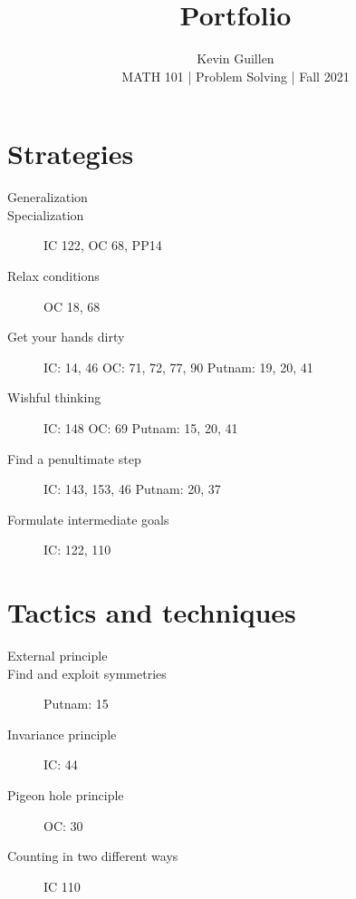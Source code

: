 \documentclass[11pt]{article}
\begin{document}
 
\title{Portfolio}
\author{Kevin Guillen\\[0.5em]
MATH 101 | Problem Solving | Fall 2021}
\date{} 
\maketitle
\newpage

\tableofcontents
\newpage
\section{Strategies}
\begin{description}
    \item[Generalization]
    \item[Specialization] IC 122, OC 68, PP14
    \item[Relax conditions] OC 18, 68
    \item[Get your hands dirty] IC: 14, 46 OC: 71, 72, 77, 90 Putnam: 19, 20, 41
    \item[Wishful thinking] IC: 148 OC: 69 Putnam: 15, 20, 41 
    \item[Find a penultimate step] IC: 143, 153, 46 Putnam: 20, 37
    \item[Formulate intermediate goals] IC: 122, 110     
\end{description}

\section{Tactics and techniques}
\begin{description}
    \item[External principle]
    \item[Find and exploit symmetries] Putnam: 15
    \item[Invariance principle] IC: 44
    \item[Pigeon hole principle] OC: 30
    \item[Counting in two different ways] IC 110
\end{description}
\end{document}
